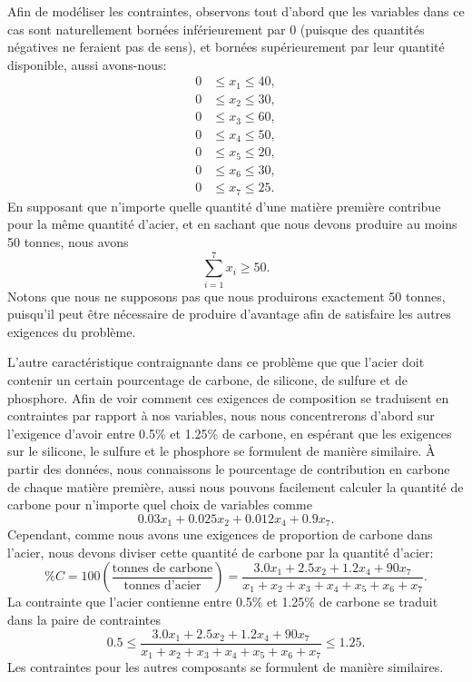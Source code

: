 \begin{example}
Afin de modéliser les contraintes, observons tout d'abord que
les variables dans ce cas sont naturellement bornées inférieurement par 0 (puisque des quantités négatives ne feraient pas de sens), et bornées supérieurement par leur quantité disponible, aussi avons-nous:
\begin{align*}
0 & \leq x_1 \leq 40, \\
0 & \leq x_2 \leq 30, \\
0 & \leq x_3 \leq 60, \\
0 & \leq x_4 \leq 50, \\
0 & \leq x_5 \leq 20, \\
0 & \leq x_6 \leq 30, \\
0 & \leq x_7 \leq 25.
\end{align*}
En supposant que n'importe quelle quantité d'une matière première contribue pour la même quantité d'acier, et en sachant que nous devons produire au moins 50 tonnes, nous avons
\[
\sum_{i = 1}^7 x_i \geq 50.
\]
Notons que nous ne supposons pas que nous produirons exactement 50 tonnes, puisqu'il peut être nécessaire de produire d'avantage afin de satisfaire les autres exigences du problème.

L'autre caractéristique contraignante dans ce problème que que l'acier doit contenir un certain pourcentage de carbone, de silicone, de sulfure et de phosphore.
Afin de voir comment ces exigences de composition se traduisent en contraintes par rapport à nos variables, nous nous concentrerons d'abord sur l'exigence d'avoir entre 0.5\% et 1.25\% de carbone, en espérant que les exigences sur le silicone, le sulfure et le phosphore se formulent de manière similaire.
À partir des données, nous connaissons le pourcentage de contribution en carbone de chaque matière première, aussi nous pouvons facilement calculer la quantité de carbone pour n'importe quel choix de variables comme
\[
0.03x_1+0.025x_2+0.012x_4+0.9x_7.
\]
Cependant, comme nous avons une exigences de proportion de carbone dans l'acier, nous devons diviser cette quantité de carbone par la quantité d'acier:
\[
\%C= 100 \left( \frac{\mbox{tonnes de carbone}}{\mbox{tonnes d'acier}} \right)
=
\frac{3.0 x_1+2.5 x_2+1.2 x_4+90 x_7}
{x_1+x_2+x_3+x_4+x_5+x_6+x_7}
.
\]
La contrainte que l'acier contienne entre 0.5\% et 1.25\% de carbone se traduit
dans la paire de contraintes
\begin{equation}
0.5 \leq
\frac{3.0 x_1+2.5 x_2+1.2 x_4+90 x_7}
{x_1+x_2+x_3+x_4+x_5+x_6+x_7}
\leq 1.25.
\label{eq:steel_composition}
\end{equation}
Les contraintes pour les autres composants se formulent de manière similaires.


\end{example}
